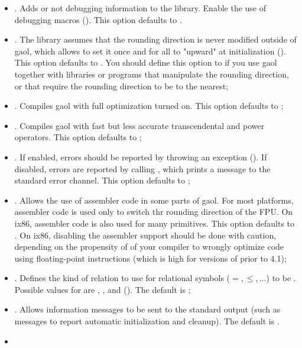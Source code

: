 \documentclass{manual}
\let\leq=\leqslant
\begin{document}
\begin{itemize}
\item {}. Adds or not debugging
information to the library. Enable the use of debugging macros ().
This option defaults to .
%
\item {}. The library
  assumes that the rounding direction is never modified outside of
  gaol, which allows to set it once and for all to "upward" at
  initialization ().
  This option defaults to . You should define this option to  if you use
  gaol together with libraries or programs that manipulate the rounding direction, or that
  require the rounding direction to be to the nearest;
%
\item {}. Compiles gaol with full optimization turned on.
  This option defaults to ;
\item {}. Compiles gaol with fast but less accurate
  transcendental and power operators. This option defaults to ;
%
\item {}. If enabled, errors
  should be reported by throwing an exception (). If
  disabled, errors are reported by calling , which
  prints a message to the standard error channel. This option defaults
  to ;
%
\item {}. Allows the use of assembler
  code in some parts of gaol. For most platforms, assembler code is
  used only to switch thr rounding direction of the FPU. On ix86,
  assembler code is also used for many primitives. This option
  defaults to . On ix86, disabling the assembler support
  should be done with caution, depending on the propensity of of your
  compiler to wrongly optimize code using floating-point instructions
  (which is high for versions of  prior to 4.1);
%
\item {}. Defines the kind of relation
  to use for relational symbols ($=,\leq, \dots$) to be
  . Possible values for  are
  , , and  ().
  The default is ;
%
\item {}. Allows information messages to be sent to the standard
  output (such as messages to report automatic initialization and cleanup).
  The default is .
%
%
\item 
\end{itemize}
\end{document}
